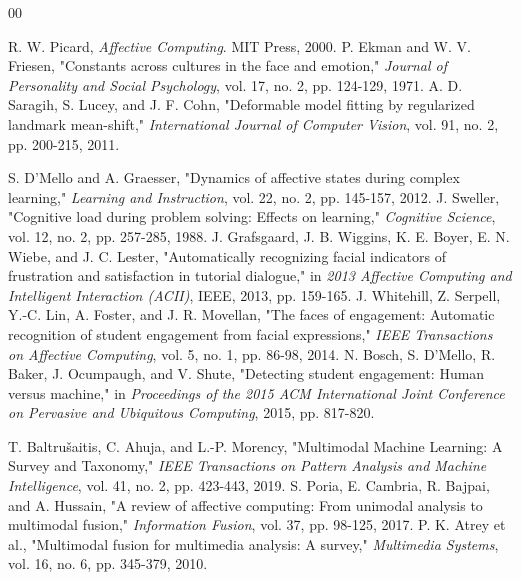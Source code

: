 \documentclass[conference]{IEEEtran}
\begin{document}
\begin{thebibliography}{00}

 R. W. Picard, \textit{Affective Computing}. MIT Press, 2000.
 P. Ekman and W. V. Friesen, "Constants across cultures in the face and emotion," \textit{Journal of Personality and Social Psychology}, vol. 17, no. 2, pp. 124-129, 1971.
 A. D. Saragih, S. Lucey, and J. F. Cohn, "Deformable model fitting by regularized landmark mean-shift," \textit{International Journal of Computer Vision}, vol. 91, no. 2, pp. 200-215, 2011.

 S. D'Mello and A. Graesser, "Dynamics of affective states during complex learning," \textit{Learning and Instruction}, vol. 22, no. 2, pp. 145-157, 2012.
 J. Sweller, "Cognitive load during problem solving: Effects on learning," \textit{Cognitive Science}, vol. 12, no. 2, pp. 257-285, 1988.
 J. Grafsgaard, J. B. Wiggins, K. E. Boyer, E. N. Wiebe, and J. C. Lester, "Automatically recognizing facial indicators of frustration and satisfaction in tutorial dialogue," in \textit{2013 Affective Computing and Intelligent Interaction (ACII)}, IEEE, 2013, pp. 159-165.
 J. Whitehill, Z. Serpell, Y.-C. Lin, A. Foster, and J. R. Movellan, "The faces of engagement: Automatic recognition of student engagement from facial expressions," \textit{IEEE Transactions on Affective Computing}, vol. 5, no. 1, pp. 86-98, 2014.
 N. Bosch, S. D'Mello, R. Baker, J. Ocumpaugh, and V. Shute, "Detecting student engagement: Human versus machine," in \textit{Proceedings of the 2015 ACM International Joint Conference on Pervasive and Ubiquitous Computing}, 2015, pp. 817-820.

 T. Baltrušaitis, C. Ahuja, and L.-P. Morency, "Multimodal Machine Learning: A Survey and Taxonomy," \textit{IEEE Transactions on Pattern Analysis and Machine Intelligence}, vol. 41, no. 2, pp. 423-443, 2019.
 S. Poria, E. Cambria, R. Bajpai, and A. Hussain, "A review of affective computing: From unimodal analysis to multimodal fusion," \textit{Information Fusion}, vol. 37, pp. 98-125, 2017.
 P. K. Atrey et al., "Multimodal fusion for multimedia analysis: A survey," \textit{Multimedia Systems}, vol. 16, no. 6, pp. 345-379, 2010.


\end{thebibliography}
\end{document}
